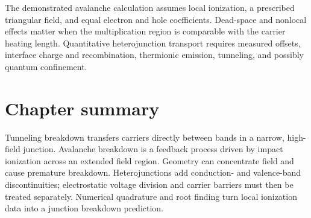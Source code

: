\begin{boundarybox}
The demonstrated avalanche calculation assumes local ionization, a prescribed
triangular field, and equal electron and hole coefficients.  Dead-space and
nonlocal effects matter when the multiplication region is comparable with the
carrier heating length.  Quantitative heterojunction transport requires
measured offsets, interface charge and recombination, thermionic emission,
tunneling, and possibly quantum confinement.
\end{boundarybox}

\section{Chapter summary}

Tunneling breakdown transfers carriers directly between bands in a narrow,
high-field junction.  Avalanche breakdown is a feedback process driven by
impact ionization across an extended field region.  Geometry can concentrate
field and cause premature breakdown.  Heterojunctions add conduction- and
valence-band discontinuities; electrostatic voltage division and carrier
barriers must then be treated separately.  Numerical quadrature and root
finding turn local ionization data into a junction breakdown prediction.

